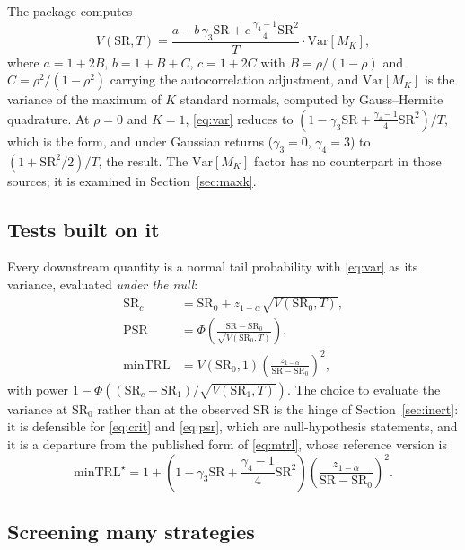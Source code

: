 \documentclass[11pt,a4paper]{article}
\newcommand{\SR}{\mathrm{SR}}
\begin{document}
The package computes
\begin{equation}
  V(\SR, T) = \frac{a - b \, \gamma_3 \SR + c \, \frac{\gamma_4 - 1}{4} \SR^2}{T}
  \cdot \mathrm{Var}[M_K],
  \label{eq:var}
\end{equation}
where $a = 1 + 2B$, $b = 1 + B + C$, $c = 1 + 2C$ with
$B = \rho/(1-\rho)$ and $C = \rho^2/(1-\rho^2)$ carrying the
autocorrelation adjustment, and $\mathrm{Var}[M_K]$ is the variance of the
maximum of $K$ standard normals, computed by Gauss--Hermite quadrature. At
$\rho = 0$ and $K = 1$, \eqref{eq:var} reduces to
$(1 - \gamma_3 \SR + \frac{\gamma_4-1}{4}\SR^2)/T$, which is the
\citet{bailey2012} form, and under Gaussian returns
($\gamma_3 = 0$, $\gamma_4 = 3$) to $(1 + \SR^2/2)/T$, the \citet{lo2002}
result. The $\mathrm{Var}[M_K]$ factor has no counterpart in those sources; it
is examined in Section~\ref{sec:maxk}.

\subsection{Tests built on it}

Every downstream quantity is a normal tail probability with
\eqref{eq:var} as its variance, evaluated \emph{under the null}:
\begin{align}
  \SR_c &= \SR_0 + z_{1-\alpha}\sqrt{V(\SR_0, T)}, \label{eq:crit}\\
  \mathrm{PSR} &= \Phi\!\left( \frac{\SR - \SR_0}{\sqrt{V(\SR_0, T)}} \right),
    \label{eq:psr}\\
  \mathrm{minTRL} &= V(\SR_0, 1) \left( \frac{z_{1-\alpha}}{\SR - \SR_0} \right)^2 ,
    \label{eq:mtrl}
\end{align}
with power $1 - \Phi((\SR_c - \SR_1)/\sqrt{V(\SR_1, T)})$. The choice to
evaluate the variance at $\SR_0$ rather than at the observed $\SR$ is the
hinge of Section~\ref{sec:inert}: it is defensible for \eqref{eq:crit} and
\eqref{eq:psr}, which are null-hypothesis statements, and it is a departure
from the published form of \eqref{eq:mtrl}, whose reference version is
\begin{equation}
  \mathrm{minTRL}^{\star} = 1 +
  \left( 1 - \gamma_3 \SR + \frac{\gamma_4 - 1}{4}\SR^2 \right)
  \left( \frac{z_{1-\alpha}}{\SR - \SR_0} \right)^2 .
  \label{eq:mtrlstar}
\end{equation}

\subsection{Screening many strategies}
\end{document}
